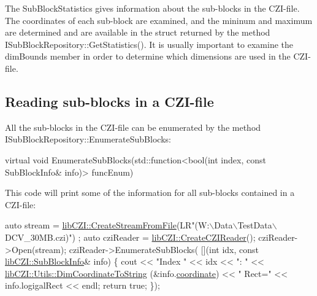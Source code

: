 The {\ttfamily Sub\+Block\+Statistics} gives information about the sub-\/blocks in the C\+Z\+I-\/file. The coordinates of each sub-\/block are examined, and the mininum and maximum are determined and are available in the struct returned by the method {\ttfamily I\+Sub\+Block\+Repository\+::\+Get\+Statistics()}. It is usually important to examine the dim\+Bounds member in order to determine which dimensions are used in the C\+Z\+I-\/file.

\subsection*{Reading sub-\/blocks in a C\+Z\+I-\/file}

All the sub-\/blocks in the C\+Z\+I-\/file can be enumerated by the method {\ttfamily I\+Sub\+Block\+Repository\+::\+Enumerate\+Sub\+Blocks}\+:


\begin{DoxyCode}
\textcolor{keyword}{virtual} \textcolor{keywordtype}{void} EnumerateSubBlocks(std::function<\textcolor{keywordtype}{bool}(\textcolor{keywordtype}{int} index, \textcolor{keyword}{const} SubBlockInfo& info)> funcEnum) 
\end{DoxyCode}


This code will print some of the information for all sub-\/blocks contained in a C\+Z\+I-\/file\+:


\begin{DoxyCode}
\textcolor{keyword}{auto} stream = \hyperlink{namespacelib_c_z_i_a8783cf40c0eac418632db90c4f20b43b}{libCZI::CreateStreamFromFile}(LR\textcolor{stringliteral}{"(W:\(\backslash\)Data\(\backslash\)TestData\(\backslash\)DCV\_30MB.czi)")
      ;}
\textcolor{stringliteral}{}\textcolor{keyword}{auto} cziReader = \hyperlink{namespacelib_c_z_i_abe978d8bd50abe94c2d37df6212859e8}{libCZI::CreateCZIReader}();
cziReader->Open(stream);
cziReader->EnumerateSubBlocks(
    [](\textcolor{keywordtype}{int} idx, \textcolor{keyword}{const} \hyperlink{structlib_c_z_i_1_1_sub_block_info}{libCZI::SubBlockInfo}& info)
\{
    cout << \textcolor{stringliteral}{"Index "} << idx << \textcolor{stringliteral}{": "} << \hyperlink{classlib_c_z_i_1_1_utils_aeb42843e65615302b51b68ad2b376e6d}{libCZI::Utils::DimCoordinateToString}
      (&info.\hyperlink{structlib_c_z_i_1_1_sub_block_info_ae4acf2922fe594327d1c6fbfb2062781}{coordinate}) << \textcolor{stringliteral}{" Rect="} << info.logigalRect << endl;
    \textcolor{keywordflow}{return} \textcolor{keyword}{true};
\});
\end{DoxyCode}


